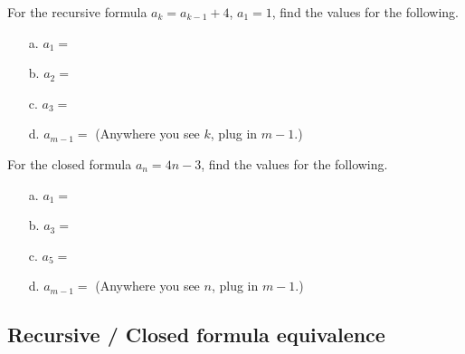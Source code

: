         \begin{questionNOGRADE}{\thequestion}

            For the recursive formula $a_{k} = a_{k-1} + 4$, $a_{1} = 1$,
            find the values for the following.

            \begin{itemize}
                \item[a.] $a_{1} = $    
                \item[b.] $a_{2} = $    
                \item[c.] $a_{3} = $    
                \item[d.] $a_{m-1} = $  (Anywhere you see $k$, plug in $m-1$.)
            \end{itemize}
            
        \end{questionNOGRADE}

        \newpage

        \begin{questionNOGRADE}{\thequestion}

            For the closed formula $a_{n} = 4n - 3$,
            find the values for the following.

            \begin{itemize}
                \item[a.] $a_{1} = $    
                \item[b.] $a_{3} = $    
                \item[c.] $a_{5} = $    
                \item[d.] $a_{m-1} = $  (Anywhere you see $n$, plug in $m-1$.) \\
            \end{itemize}
            
        \end{questionNOGRADE}

    \hrulefill

    \subsection{Recursive / Closed formula equivalence}

